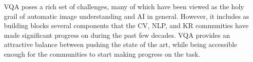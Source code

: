 VQA poses a rich set of challenges, many of which have been viewed as the holy grail of
automatic image understanding and AI in general. However, it includes as building blocks
several components that the CV, NLP, and KR \cite{NEEL,NEIL,Cyc,ConceptNet,Freebase} communities have made
significant progress on during the past few decades. VQA provides an attractive balance
between pushing the state of the art, while being accessible enough for the communities
to start making progress on the task.


